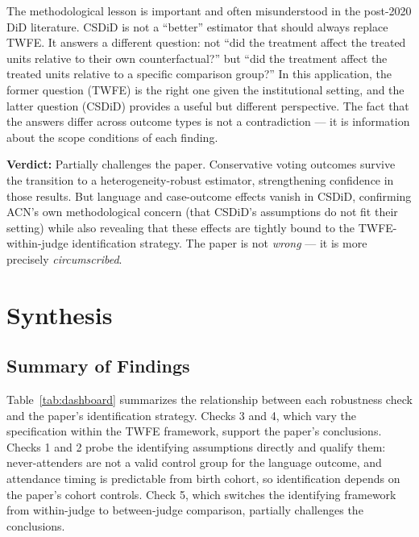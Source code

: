 \documentclass[12pt,a4paper]{article}
\begin{document}
The methodological lesson is important and often misunderstood in the post-2020 DiD literature. CSDiD is not a ``better'' estimator that should always replace TWFE. It answers a different question: not ``did the treatment affect the treated units relative to their own counterfactual?'' but ``did the treatment affect the treated units relative to a specific comparison group?'' In this application, the former question (TWFE) is the right one given the institutional setting, and the latter question (CSDiD) provides a useful but different perspective. The fact that the answers differ across outcome types is not a contradiction --- it is information about the scope conditions of each finding.

\textbf{Verdict:} Partially challenges the paper. Conservative voting outcomes survive the transition to a heterogeneity-robust estimator, strengthening confidence in those results. But language and case-outcome effects vanish in CSDiD, confirming ACN's own methodological concern (that CSDiD's assumptions do not fit their setting) while also revealing that these effects are tightly bound to the TWFE-within-judge identification strategy. The paper is not \emph{wrong} --- it is more precisely \emph{circumscribed}.

\section{Synthesis}
\label{sec:synthesis}

\subsection{Summary of Findings}

Table~\ref{tab:dashboard} summarizes the relationship between each robustness check and the paper's identification strategy. Checks 3 and 4, which vary the specification within the TWFE framework, support the paper's conclusions. Checks 1 and 2 probe the identifying assumptions directly and qualify them: never-attenders are not a valid control group for the language outcome, and attendance timing is predictable from birth cohort, so identification depends on the paper's cohort controls. Check 5, which switches the identifying framework from within-judge to between-judge comparison, partially challenges the conclusions.
\end{document}
